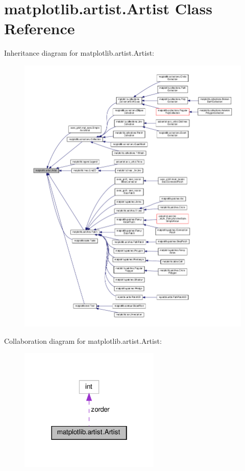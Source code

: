 \hypertarget{classmatplotlib_1_1artist_1_1Artist}{}\section{matplotlib.\+artist.\+Artist Class Reference}
\label{classmatplotlib_1_1artist_1_1Artist}


Inheritance diagram for matplotlib.\+artist.\+Artist\+:
\nopagebreak
\begin{figure}[H]
\begin{center}
\leavevmode
\includegraphics[width=350pt]{classmatplotlib_1_1artist_1_1Artist__inherit__graph}
\end{center}
\end{figure}


Collaboration diagram for matplotlib.\+artist.\+Artist\+:
\nopagebreak
\begin{figure}[H]
\begin{center}
\leavevmode
\includegraphics[width=190pt]{classmatplotlib_1_1artist_1_1Artist__coll__graph}
\end{center}
\end{figure}
